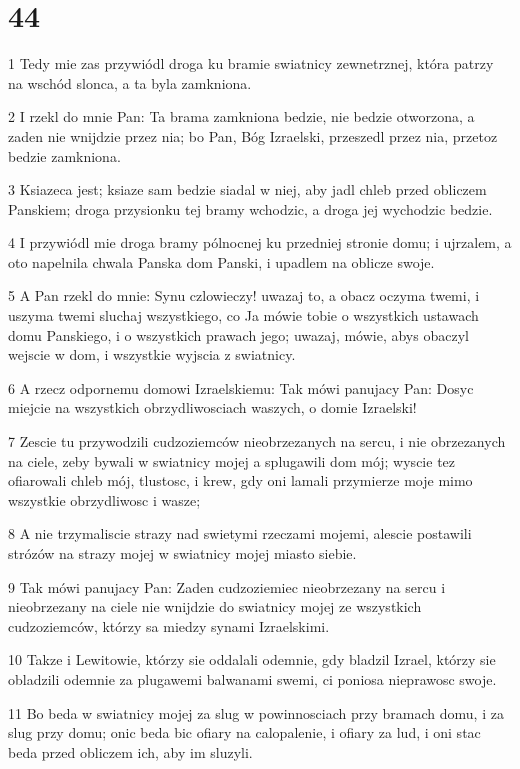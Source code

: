 \chapter{44}

\par 1 Tedy mie zas przywiódl droga ku bramie swiatnicy zewnetrznej, która patrzy na wschód slonca, a ta byla zamkniona.
\par 2 I rzekl do mnie Pan: Ta brama zamkniona bedzie, nie bedzie otworzona, a zaden nie wnijdzie przez nia; bo Pan, Bóg Izraelski, przeszedl przez nia, przetoz bedzie zamkniona.
\par 3 Ksiazeca jest; ksiaze sam bedzie siadal w niej, aby jadl chleb przed obliczem Panskiem; droga przysionku tej bramy wchodzic, a droga jej wychodzic bedzie.
\par 4 I przywiódl mie droga bramy pólnocnej ku przedniej stronie domu; i ujrzalem, a oto napelnila chwala Panska dom Panski, i upadlem na oblicze swoje.
\par 5 A Pan rzekl do mnie: Synu czlowieczy! uwazaj to, a obacz oczyma twemi, i uszyma twemi sluchaj wszystkiego, co Ja mówie tobie o wszystkich ustawach domu Panskiego, i o wszystkich prawach jego; uwazaj, mówie, abys obaczyl wejscie w dom, i wszystkie wyjscia z swiatnicy.
\par 6 A rzecz odpornemu domowi Izraelskiemu: Tak mówi panujacy Pan: Dosyc miejcie na wszystkich obrzydliwosciach waszych, o domie Izraelski!
\par 7 Zescie tu przywodzili cudzoziemców nieobrzezanych na sercu, i nie obrzezanych na ciele, zeby bywali w swiatnicy mojej a splugawili dom mój; wyscie tez ofiarowali chleb mój, tlustosc, i krew, gdy oni lamali przymierze moje mimo wszystkie obrzydliwosc i wasze;
\par 8 A nie trzymaliscie strazy nad swietymi rzeczami mojemi, alescie postawili strózów na strazy mojej w swiatnicy mojej miasto siebie.
\par 9 Tak mówi panujacy Pan: Zaden cudzoziemiec nieobrzezany na sercu i nieobrzezany na ciele nie wnijdzie do swiatnicy mojej ze wszystkich cudzoziemców, którzy sa miedzy synami Izraelskimi.
\par 10 Takze i Lewitowie, którzy sie oddalali odemnie, gdy bladzil Izrael, którzy sie obladzili odemnie za plugawemi balwanami swemi, ci poniosa nieprawosc swoje.
\par 11 Bo beda w swiatnicy mojej za slug w powinnosciach przy bramach domu, i za slug przy domu; onic beda bic ofiary na calopalenie, i ofiary za lud, i oni stac beda przed obliczem ich, aby im sluzyli.
